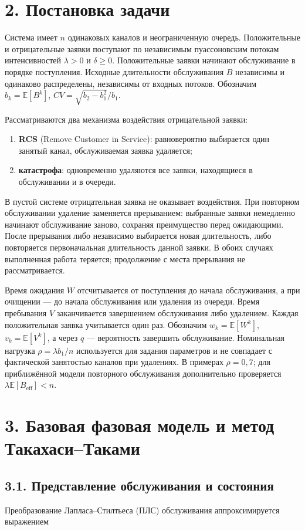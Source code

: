 \section*{2. Постановка задачи}
Система имеет \(n\) одинаковых каналов и неограниченную очередь. Положительные и отрицательные заявки поступают по независимым пуассоновским потокам интенсивностей \(\lambda>0\) и \(\delta\ge0.\) Положительные заявки начинают обслуживание в порядке поступления. Исходные длительности обслуживания \(B\) независимы и одинаково распределены, независимы от входных потоков. Обозначим \(b_k=\mathbb E[B^k]\), \(CV=\sqrt{b_2-b_1^2}/b_1.\)

Рассматриваются два механизма воздействия отрицательной заявки:
\begin{enumerate}[leftmargin=1.5em]
\item \textbf{RCS} (Remove Customer in Service): равновероятно выбирается один занятый канал, обслуживаемая заявка удаляется;
\item \textbf{катастрофа}: одновременно удаляются все заявки, находящиеся в обслуживании и в очереди.
\end{enumerate}
В пустой системе отрицательная заявка не оказывает воздействия. При повторном обслуживании удаление заменяется прерыванием: выбранные заявки немедленно начинают обслуживание заново, сохраняя преимущество перед ожидающими. После прерывания либо независимо выбирается новая длительность, либо повторяется первоначальная длительность данной заявки. В обоих случаях выполненная работа теряется; продолжение с места прерывания не рассматривается.

Время ожидания \(W\) отсчитывается от поступления до начала обслуживания, а при очищении --- до начала обслуживания или удаления из очереди. Время пребывания \(V\) заканчивается завершением обслуживания либо удалением. Каждая положительная заявка учитывается один раз. Обозначим \(w_k=\mathbb E[W^k]\), \(v_k=\mathbb E[V^k]\), а через \(q\) --- вероятность завершить обслуживание. Номинальная нагрузка \(\rho=\lambda b_1/n\) используется для задания параметров и не совпадает с фактической занятостью каналов при удалениях. В примерах \(\rho=0{,}7\); для приближённой модели повторного обслуживания дополнительно проверяется \(\lambda\mathbb E[B_{\mathrm{eff}}]<n.\)

\section*{3. Базовая фазовая модель и метод Такахаси--Таками}
\subsection*{3.1. Представление обслуживания и состояния}
Преобразование Лапласа--Стилтьеса (ПЛС) обслуживания аппроксимируется выражением


